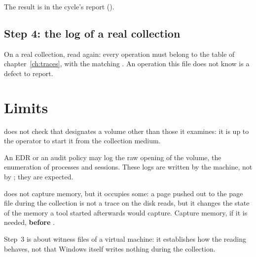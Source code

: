 \documentclass[11pt,a4paper,oneside]{report}
\begin{document}
The result is in the cycle's report ().

\section{Step 4: the log of a real collection}

On a real collection, read  again: every operation
must belong to the table of chapter~\ref{ch:traces}, with the matching
. An operation this file does not know is a defect to
report.

\chapter{Limits}

\begin{description}[style=nextline,leftmargin=1.2em]
  \item[Output folder] \wac{} does not check that  designates a
        volume other than those it examines: it is up to the operator to start
        it from the collection medium.
  \item[Monitoring] An EDR or an audit policy may log the raw opening of the
        volume, the enumeration of processes and sessions. These logs are
        written by the machine, not by \wac{}; they are expected.
  \item[Memory] \wac{} does not capture memory, but it occupies some: a page
        pushed out to the page file during the collection is not a trace on
        the disk \wac{} reads, but it changes the state of the memory a tool
        started afterwards would capture. Capture memory, if it is needed,
        \textbf{before} \wac{}.
  \item[Measurement] Step~3 is about witness files of a virtual machine: it
        establishes how the reading behaves, not that Windows itself writes
        nothing during the collection.
\end{description}
\end{document}
